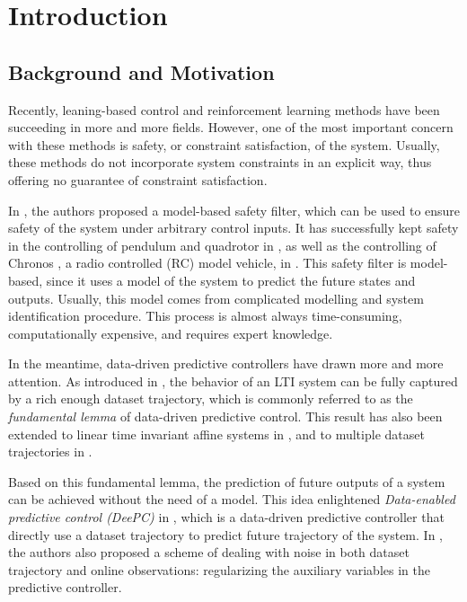 \chapter{Introduction}\label{chap:introduction}


\section{Background and Motivation}\label{sec:motivation-and-background}

Recently, leaning-based control and reinforcement learning methods have been succeeding in more and more fields.
However, one of the most important concern with these methods is safety, or constraint satisfaction, of the system.
Usually, these methods do not incorporate system constraints in an explicit way, thus offering no guarantee of constraint satisfaction.

In \cite{wabersich_predictive_sf_2021}, the authors proposed a model-based safety filter, which can be used to ensure safety of the system under arbitrary control inputs.
It has successfully kept safety in the controlling of pendulum and quadrotor in \cite{wabersich_predictive_sf_2021}, as well as the controlling of Chronos \cite{carron_chronos_2022}, a radio controlled (RC) model vehicle, in \cite{tearle_psf_racing_2021}.
This safety filter is model-based, since it uses a model of the system to predict the future states and outputs.
Usually, this model comes from complicated modelling and system identification procedure.
This process is almost always time-consuming, computationally expensive, and requires expert knowledge.

In the meantime, data-driven predictive controllers have drawn more and more attention.
As introduced in \cite{willems_fundamental_2005}, the behavior of an LTI system can be fully captured by a rich enough dataset trajectory, which is commonly referred to as the \emph{fundamental lemma} of data-driven predictive control.
This result has also been extended to linear time invariant affine systems in \cite{martinelli_affine_2022}, and to multiple dataset trajectories in \cite{van_waarde_multiple_2020}.

Based on this fundamental lemma, the prediction of future outputs of a system can be achieved without the need of a model.
This idea enlightened \emph{Data-enabled predictive control (DeePC)} in \cite{coulson_deepc_2019}, which is a data-driven predictive controller that directly use a dataset trajectory to predict future trajectory of the system.
In \cite{coulson_deepc_2019}, the authors also proposed a scheme of dealing with noise in both dataset trajectory and online observations: regularizing the auxiliary variables in the predictive controller.

